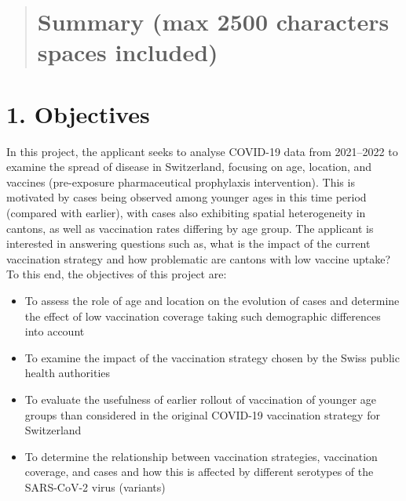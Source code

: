 \documentclass[authordate, rga]{jote-new-article}
\author[1]{\mbox{Maria Bekker-Nielsen Dunbar\orcid{0000-0002-7249-3524}}}
\affil[1]{OsloMet – Oslo Metropolitan University}
\begin{document}
\begin{frontmatter}
  \maketitle
  \begin{abstract}
    \section{Summary (max 2500 characters spaces included)}
    \printabstracttext
  \end{abstract}
\end{frontmatter}






\section{1. Objectives}



In this project, the applicant seeks to analyse COVID-19 data from 2021--2022 to examine the spread of disease in Switzerland, focusing on age, location, and vaccines (pre-exposure pharmaceutical prophylaxis intervention). This is motivated by cases being observed among younger ages in this time period (compared with earlier), with cases also exhibiting spatial heterogeneity in cantons, as well as vaccination rates differing by age group. The applicant is interested in answering questions such as, what is the impact of the current vaccination strategy and how problematic are cantons with low vaccine uptake? To this end, the objectives of this project are:


\begin{itemize}
  \item To assess the role of age and location on the evolution of cases and determine the effect of low vaccination coverage taking such demographic differences into account



  \item To examine the impact of the vaccination strategy chosen by the Swiss public health authorities



  \item To evaluate the usefulness of earlier rollout of vaccination of younger age groups than considered in the original COVID-19 vaccination strategy for Switzerland



  \item To determine the relationship between vaccination strategies, vaccination coverage, and cases and how this is affected by different serotypes of the SARS-CoV-2 virus (variants)


\end{itemize}
\end{document}
